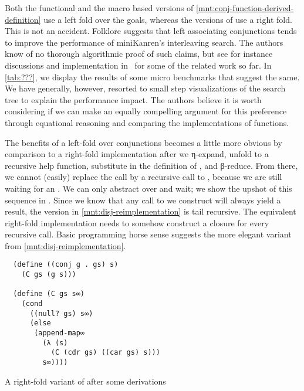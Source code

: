 \documentclass[sigplan,balance,pbalance,natbib=false]{acmart}
\begin{document}
Both the functional and the macro based versions of
\cref{mnt:conj-function-derived-definition} use a left fold over the
goals, whereas the versions of  use a right fold.
This is not an accident.
%
%
Folklore suggests that left associating conjunctions tends to improve
the performance of miniKanren's interleaving search. The authors know
of no thorough algorithmic proof of such claims, but see for instance
discussions and implementation in~\cite{rosenblatt2019first} for some
of the related work so far. In \cref{tab:???}, we display the results
of some micro benchmarks that suggest the same. We have generally,
however, resorted to small step visualizations of the search tree to
explain the performance impact. The authors believe it is worth
considering if we can make an equally compelling argument for this
preference through equational reasoning and comparing the
implementations of functions.

The benefits of a left-fold over conjunctions becomes a little more
obvious by comparison to a right-fold implementation after we
η-expand, unfold to a recursive help function, substitute in the
definition of , and β-reduce. From there, we cannot
(easily) replace the  call by a recursive call
to , because we are still waiting for an .
We can only abstract over  and wait; we show the upshot
of this sequence in . Since we
know that any call to  we construct will
always yield a result, the version in \cref{mnt:disj-reimplementation}
is tail recursive. The equivalent right-fold implementation needs to
somehow construct a closure for every recursive call. Basic
programming horse sense suggests the more elegant variant from
\cref{mnt:disj-reimplementation}.

\begin{listing}
\begin{verbatim}
  (define ((conj g . gs) s)
    (C gs (g s)))

  (define (C gs s∞)
    (cond
      ((null? gs) s∞)
      (else
       (append-map∞
         (λ (s)
           (C (cdr gs) ((car gs) s)))
         s∞))))
\end{verbatim}
  \caption{A right-fold variant of  after some derivations}\label{mnt:conj-right-fold-definition}
\end{listing}
\end{document}
